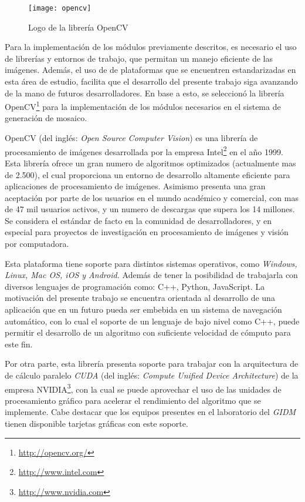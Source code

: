 \begin{wrapfigure}{R}{5cm}
	\begin{center}
		\vspace*{-0.2in}
		\texttt{[image: opencv]}
	\end{center}
	\caption{Logo de la librería OpenCV}
\end{wrapfigure}

Para la implementación de los módulos previamente descritos, es necesario el uso de librerías y entornos de trabajo, que permitan un manejo eficiente de las imágenes. Además, el uso de de plataformas que se encuentren estandarizadas en esta área de estudio, facilita que el desarrollo del presente trabajo siga avanzando de la mano de futuros desarrolladores. En base a esto, se seleccionó la librería OpenCV\footnote{\url{http://opencv.org/}} para la implementación de los módulos necesarios en el sistema de generación de mosaico.

OpenCV (del inglés: \textit{Open Source Computer Vision}) es una librería de procesamiento de imágenes desarrollada por la empresa Intel\footnote{\url{http://www.intel.com}} en el año 1999. Esta librería ofrece un gran numero de algoritmos optimizados (actualmente mas de 2.500), el cual proporciona un entorno de desarrollo altamente eficiente para aplicaciones de procesamiento de imágenes. Asimismo presenta una gran aceptación por parte de los usuarios en el mundo académico y comercial, con mas de 47 mil usuarios activos, y un numero de descargas que supera los 14 millones. Se considera el estándar de facto en la comunidad de desarrolladores, y en especial para proyectos de investigación en procesamiento de imágenes y visión por computadora. 

Esta plataforma tiene soporte para distintos sistemas operativos, como \textit{Windows, Linux, Mac OS, iOS y Android.} Además de tener la posibilidad de trabajarla con diversos lenguajes de programación como: C++, Python, JavaScript. La motivación del presente trabajo se encuentra orientada al desarrollo de una aplicación que en un futuro pueda ser embebida en un sistema de navegación automático, con lo cual el soporte de un lenguaje de bajo nivel como C++, puede permitir el desarrollo de un algoritmo con suficiente velocidad de cómputo para este fin.

Por otra parte, esta librería presenta soporte para trabajar con la arquitectura de de cálculo paralelo \textit{CUDA} (del inglés: \textit{Compute Unified Device Architecture}) de la empresa NVIDIA\footnote{\url{http://www.nvidia.com}}, con la cual se puede aprovechar el uso de las unidades de procesamiento gráfico para acelerar el rendimiento del algoritmo que se implemente. Cabe destacar que los equipos presentes en el laboratorio del \textit{GIDM} tienen disponible tarjetas gráficas con este soporte.

